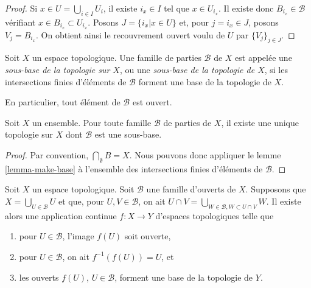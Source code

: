 \begin{proof}
Si $ x \in U = \bigcup_{i\in I} U_i $, il existe $ i_x \in I $ tel que
$ x \in U_{i_x} $. Il existe donc $ B_{i_x} \in \mathcal{B}$ vérifiant
$ x \in B_{i_x} \subset U_{i_x}$. Posons
$J = \{i_x | x \in U\}$ et, pour $j = i_x \in J$, posons
$V_j = B_{i_x}$. On obtient ainsi le recouvrement ouvert voulu de $U$ par
$\{V_j\}_{j \in J}$.
\end{proof}

\begin{definition}
\label{definition-subbase}
Soit $X$ un espace topologique. Une famille de parties $\mathcal{B}$ de $X$
est appelée une {\it sous-base de la topologie sur $X$}, ou une {\it sous-base
de la topologie de $X$}, si les intersections finies d'éléments de
$\mathcal{B}$ forment une base de la topologie de $X$.
\end{definition}

\noindent

En particulier, tout élément de $\mathcal{B}$ est ouvert.

\begin{lemma}
\label{lemma-subbase}
Soit $X$ un ensemble. Pour toute famille $\mathcal{B}$ de parties de $X$,
il existe une unique topologie sur $X$ dont $\mathcal{B}$ est une sous-base.
\end{lemma}

\begin{proof}
Par convention, $\bigcap_\emptyset B = X $. Nous pouvons donc appliquer le
lemme \ref{lemma-make-base} à l'ensemble des intersections finies d'éléments
de $\mathcal B$.
\end{proof}

\begin{lemma}
\label{lemma-create-map-from-subcollection}
Soit $X$ un espace topologique. Soit $\mathcal{B}$ une famille d'ouverts de
$X$. Supposons que $X = \bigcup_{U \in \mathcal{B}} U$ et que, pour
$U, V \in \mathcal{B}$, on ait
$U \cap V = \bigcup_{W \in \mathcal{B}, W \subset U \cap V} W$.
Il existe alors une application continue $f : X \to Y$ d'espaces
topologiques telle que
\begin{enumerate}
\item pour $U \in \mathcal{B}$, l'image $f(U)$ soit ouverte,
\item pour $U \in \mathcal{B}$, on ait $f^{-1}(f(U)) = U$, et
\item les ouverts $f(U)$, $U \in \mathcal{B}$, forment une base de la
topologie de $Y$.
\end{enumerate}
\end{lemma}

